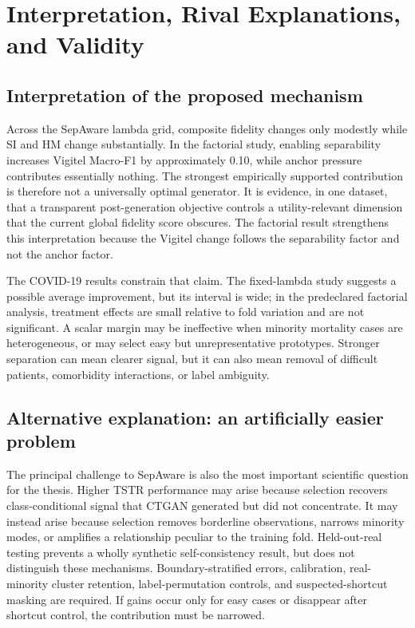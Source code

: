 \chapter{Interpretation, Rival Explanations, and Validity}
\label{chap:discussion}

\section{Interpretation of the proposed mechanism}

Across the SepAware lambda grid, composite fidelity changes only modestly while SI and HM change substantially. In the factorial study, enabling separability increases Vigitel Macro-F1 by approximately 0.10, while anchor pressure contributes essentially nothing. The strongest empirically supported contribution is therefore not a universally optimal generator. It is evidence, in one dataset, that a transparent post-generation objective controls a utility-relevant dimension that the current global fidelity score obscures. The factorial result strengthens this interpretation because the Vigitel change follows the separability factor and not the anchor factor.

The COVID-19 results constrain that claim. The fixed-lambda study suggests a possible average improvement, but its interval is wide; in the predeclared factorial analysis, treatment effects are small relative to fold variation and are not significant. A scalar margin may be ineffective when minority mortality cases are heterogeneous, or may select easy but unrepresentative prototypes. Stronger separation can mean clearer signal, but it can also mean removal of difficult patients, comorbidity interactions, or label ambiguity.

\section{Alternative explanation: an artificially easier problem}

The principal challenge to SepAware is also the most important scientific question for the thesis. Higher TSTR performance may arise because selection recovers class-conditional signal that CTGAN generated but did not concentrate. It may instead arise because selection removes borderline observations, narrows minority modes, or amplifies a relationship peculiar to the training fold. Held-out-real testing prevents a wholly synthetic self-consistency result, but does not distinguish these mechanisms. Boundary-stratified errors, calibration, real-minority cluster retention, label-permutation controls, and suspected-shortcut masking are required. If gains occur only for easy cases or disappear after shortcut control, the contribution must be narrowed.

